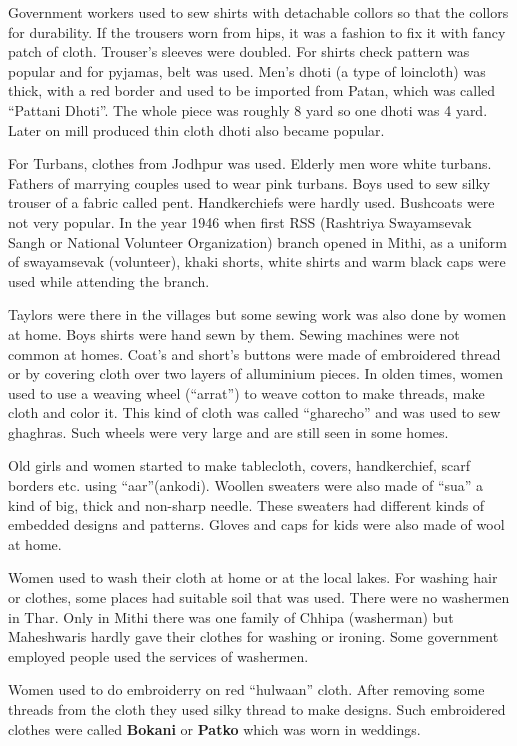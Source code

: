 Government workers used to sew shirts with detachable collors so that the
collors for durability. If the trousers worn from hips, it was a fashion to fix
it with fancy patch of cloth. Trouser's sleeves were doubled. For shirts check
pattern was popular and for pyjamas, belt was used. Men's dhoti (a type of
loincloth) was thick, with a red border and used to be imported from Patan,
which was called ``Pattani Dhoti''. The whole piece was roughly 8 yard so one
dhoti was 4 yard. Later on mill produced thin cloth dhoti also became popular.

For Turbans, clothes from Jodhpur was used. Elderly men wore white turbans.
Fathers of marrying couples used to wear pink turbans. Boys used to sew silky
trouser of a fabric called pent. Handkerchiefs were hardly used. Bushcoats were
not very popular. In the year 1946 when first RSS (Rashtriya Swayamsevak Sangh
or National Volunteer Organization) branch opened in Mithi, as a uniform of
swayamsevak (volunteer), khaki shorts, white shirts and warm black caps were
used while attending the branch.

Taylors were there in the villages but some sewing work was also done by women
at home. Boys shirts were hand sewn by them. Sewing machines were not common at
homes. Coat's and short's buttons were made of embroidered thread or by covering
cloth over two layers of alluminium pieces. In olden times, women used to use a
weaving wheel (``arrat'') to weave cotton to make threads, make cloth and color
it. This kind of cloth was called ``gharecho'' and was used to sew ghaghras.
Such wheels were very large and are still seen in some homes.

Old girls and women started to make tablecloth, covers, handkerchief, scarf
borders etc. using ``aar''(ankodi). Woollen sweaters were also made of ``sua'' a
kind of big, thick and non-sharp needle. These sweaters had different kinds of
embedded designs and patterns. Gloves and caps for kids were also made of wool
at home.

Women used to wash their cloth at home or at the local lakes. For washing hair
or clothes, some places had suitable soil that was used. There were no washermen
in Thar. Only in Mithi there was one family of Chhipa (washerman) but
Maheshwaris hardly gave their clothes for washing or ironing. Some government
employed people used the services of washermen.

Women used to do embroiderry on red ``hulwaan'' cloth. After removing some
threads from the cloth they used silky thread to make designs. Such embroidered
clothes were called \textbf{Bokani} or \textbf{Patko} which was worn in
weddings.
